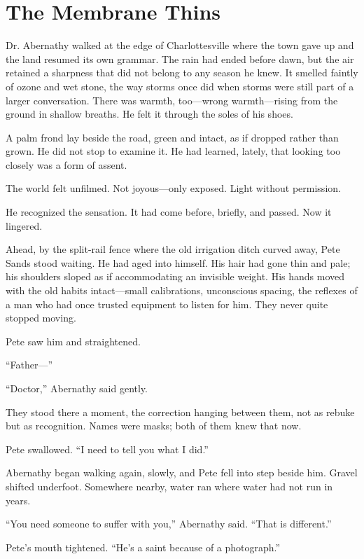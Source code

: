 \section*{The Membrane Thins}

Dr. Abernathy walked at the edge of Charlottesville where the town gave up and the land resumed its own grammar. The rain had ended before dawn, but the air retained a sharpness that did not belong to any season he knew. It smelled faintly of ozone and wet stone, the way storms once did when storms were still part of a larger conversation. There was warmth, too—wrong warmth—rising from the ground in shallow breaths. He felt it through the soles of his shoes.

A palm frond lay beside the road, green and intact, as if dropped rather than grown. He did not stop to examine it. He had learned, lately, that looking too closely was a form of assent.

The world felt unfilmed.
Not joyous---only exposed.
Light without permission.

He recognized the sensation. It had come before, briefly, and passed. Now it lingered.

Ahead, by the split-rail fence where the old irrigation ditch curved away, Pete Sands stood waiting. He had aged into himself. His hair had gone thin and pale; his shoulders sloped as if accommodating an invisible weight. His hands moved with the old habits intact—small calibrations, unconscious spacing, the reflexes of a man who had once trusted equipment to listen for him. They never quite stopped moving.

Pete saw him and straightened.

``Father---''

``Doctor,'' Abernathy said gently.

They stood there a moment, the correction hanging between them, not as rebuke but as recognition. Names were masks; both of them knew that now.

Pete swallowed. ``I need to tell you what I did.''

Abernathy began walking again, slowly, and Pete fell into step beside him. Gravel shifted underfoot. Somewhere nearby, water ran where water had not run in years.

``You need someone to suffer with you,'' Abernathy said. ``That is different.''

Pete's mouth tightened. ``He's a saint because of a photograph.''

